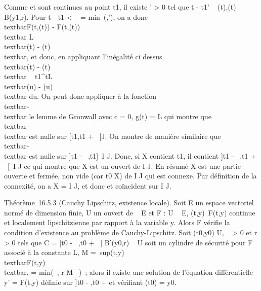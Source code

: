 Comme \phi et \psi sont continues au point t1, il existe \eta'
\textgreater{} 0 tel que \textbar{}t - t1\textbar{}\leq \eta' \rigtharrow~
\phi(t),\psi(t) \in B(y1,r). Pour \textbar{}t - t1\textbar{}
\textless{} \alpha~ = min~(\eta,\eta'), on a donc
\\textbar{}F(t,\phi(t)) -
F(t,\psi(t))\\textbar{} \leq L\\textbar{}\phi(t) -
\psi(t)\\textbar{}, et donc, en appliquant l'inégalité ci
dessus \\textbar{}\phi(t) - \psi(t)\\textbar{}
\leq\int ~
t1^tL\\textbar{}\phi(u) -
\psi(u)\\textbar{} du. On peut donc appliquer à la fonction
\\textbar{}\phi - \psi\\textbar{} le lemme de
Gronwall avec c = 0, g(t) = L qui montre que \\textbar{}\phi
- \psi\\textbar{} est nulle sur {[}t1,t1
+ \alpha~{[}\bigcapI \bigcap J. On montre de manière similaire que
\\textbar{}\phi - \psi\\textbar{} est nulle sur
{]}t1 - \alpha~,t1{]}\, \bigcap I \bigcap J. Donc, si X
contient t1, il contient {]}t1 - \alpha~,t1 +
\alpha~{[}\, \bigcap I \bigcap J ce qui montre que X est un ouvert de I \bigcap
J. En résumé X est une partie ouverte et fermée, non vide (car
t0 \in X) de I \bigcap J qui est connexe. Par définition de la
connexité, on a X = I \bigcap J, et donc \phi et \psi coïncident sur I \bigcap J.

Théorème~16.5.3 (Cauchy Lipschitz, existence locale). Soit E un espace
vectoriel normé de dimension finie, U un ouvert de ~ \times E et F : U \rightarrow~ E,
(t,y)\mapsto~F(t,y) continue et localement
lipschitzienne par rapport à la variable y. Alors F vérifie la condition
d'existence au problème de Cauchy-Lipschitz. Soit
(t0,y0) \in U, \alpha~ \textgreater{} 0 et r \textgreater{}
0 tels que C = {[}t0 - \alpha~,t0 + \alpha~{]} \times
B'(y0,r) \subset~ U soit un cylindre de sécurité pour F associé à la
constante L, M =\
sup(t,y)\inC\\textbar{}F(t,y)\\textbar{},
\eta = min(\alpha~, r \over M~ )~;
alors il existe une solution \phi de l'équation différentielle y' = F(t,y)
définie sur {]}t0 - \eta,t0 + \eta{[} et vérifiant
\phi(t0) = y0.

